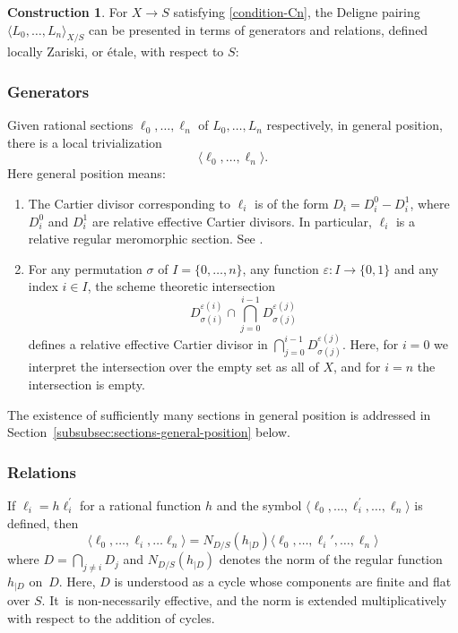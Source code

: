 \documentclass[11pt]{article}
\let\epsilon\varepsilon
\theoremstyle{plain}
\theoremstyle{definition}
\newtheorem*{construction}{Construction}
\begin{document}
\begin{construction} For $X\to S$ satisfying \eqref{condition-Cn}, the Deligne pairing $\langle L_{0},\ldots,L_{n}\rangle_{X/S}$ can be presented in terms of generators and relations, defined locally Zariski, or étale, with respect to $S$:
\subsubsection*{Generators}
Given rational sections $\ell_{0}, \ldots, \ell_n$ of $L_{0},\ldots,L_{n}$ respectively, in general position, there is a local trivialization\vspace*{-3pt}\enlargethispage{.5\baselineskip}
\begin{equation}\label{def:symbol}
\langle \ell_{0}, \ldots, \ell_n \rangle.
\end{equation} Here general position means:
\begin{enumerate}
\item\label{item:generators-1} The Cartier divisor corresponding to $\ell_i$ is of the form $D_{i}=D_i^0 - D_i^1$, where $D_i^0 $ and $D_i^1$ are relative effective Cartier divisors. In particular, $\ell_{i}$ is a relative regular meromorphic section. See \cite[]{EGAIV4}.
\item\label{item:generators-2} For any permutation $\sigma$ of $I=\lbrace 0,\ldots,n\rbrace$, any function $\epsilon: I \to \{0,1 \}$ and any index $i\in I$, the scheme theoretic intersection\vspace*{-3pt}
\begin{displaymath}
D_{\sigma(i)}^{\epsilon(i)} \cap \bigcap_{j=0}^{i-1} D_{\sigma(j)}^{\epsilon(j)}
\end{displaymath}
defines a relative effective Cartier divisor in $\bigcap_{j=0}^{i-1} D_{\sigma(j)}^{\epsilon(j)}$. Here, for $i=0$ we interpret the intersection over the empty set as all of $X$, and for $i=n$ the intersection is empty.
\end{enumerate}
The existence of sufficiently many sections in general position is addressed in Section~\ref{subsubsec:sections-general-position} below.

\subsubsection*{Relations}
If $\ell_i = h \ell_i^{\prime}$ for a rational function $h$ and the symbol $\langle\ell_{0},\ldots,\ell_{i}^{\prime},\ldots,\ell_{n}\rangle$ is defined, then\vspace*{-3pt}
\begin{equation}\label{eq:relationElkikDucrot}
\langle \ell_{0}, \ldots, \ell_i,\ldots \ell_n \rangle = N_{D/S}(h_{\mid D}) \langle \ell_{0}, \ldots, \ell_i', \ldots, \ell_n \rangle
\end{equation}
where $D = \bigcap_{j \neq i} D_j $ and $N_{D/S}(h_{\mid D})$ denotes the norm of the regular function $h_{\mid D}$ on~$D$. Here, $D$ is understood as a cycle whose components are finite and flat over $S$. It~is non-necessarily effective, and the norm is extended multiplicatively with respect to the addition of cycles.
\end{construction}
\end{document}
